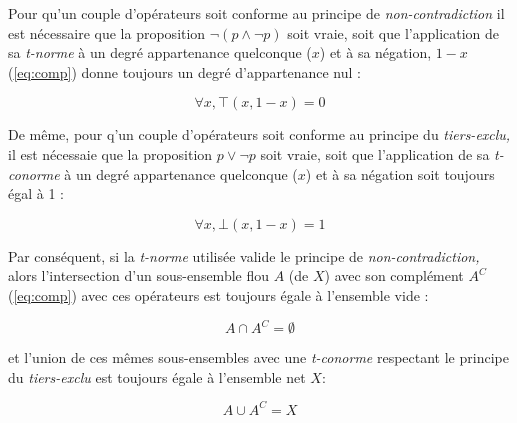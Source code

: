 Pour qu'un couple d'opérateurs soit conforme au principe de
\emph{non-contradiction} il est nécessaire que la proposition
\(\neg (p \wedge \neg p)\) soit vraie, soit que l’application de sa
\emph{t-norme} à un degré appartenance quelconque (\(x\)) et à sa
négation, \(1-x\) (\autoref{eq:comp}) donne toujours un degré
d'appartenance nul :

\begin{equation}
  \forall x, ⊤(x,1-x) = 0
\end{equation}

De même, pour q'un couple d'opérateurs soit conforme au principe du
\emph{tiers-exclu,} il est nécessaie que la proposition
\(p \vee \neg p\) soit vraie, soit que l’application de sa
\emph{t-conorme} à un degré appartenance quelconque (\(x\)) et à sa
négation soit toujours égal à 1 :

\begin{equation}
  \forall x, ⊥(x,1-x) = 1
\end{equation}

Par conséquent, si la \emph{t-norme} utilisée valide le principe de
\emph{non-contradiction,} alors l'intersection d'un sous-ensemble flou
\(A\) (de \(X\)) avec son complément \(A^C\) (\autoref{eq:comp}) avec
ces opérateurs est toujours égale à l'ensemble vide :

\begin{equation}
  \label{eq:ensemble_LNC}
  A \cap A^C = \emptyset
\end{equation}

et l'union de ces mêmes sous-ensembles avec une \emph{t-conorme}
respectant le principe du \emph{tiers-exclu} est toujours égale à
l'ensemble net \(X\):

\begin{equation}
  \label{eq:ensemble_LEM}
  A \cup A^C = X
\end{equation}

